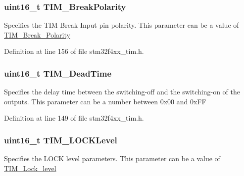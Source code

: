 \hypertarget{struct_t_i_m___b_d_t_r_init_type_def_a71f25c4b4d7207152436dd716a6cb2f1}{
\subsubsection[{T\-I\-M\-\_\-\-Break\-Polarity}]{\setlength{\rightskip}{0pt plus 5cm}uint16\-\_\-t T\-I\-M\-\_\-\-Break\-Polarity}}\label{struct_t_i_m___b_d_t_r_init_type_def_a71f25c4b4d7207152436dd716a6cb2f1}
Specifies the T\-I\-M Break Input pin polarity. This parameter can be a value of \hyperlink{group___t_i_m___break___polarity}{T\-I\-M\-\_\-\-Break\-\_\-\-Polarity} 

Definition at line 156 of file stm32f4xx\-\_\-tim.\-h.

\hypertarget{struct_t_i_m___b_d_t_r_init_type_def_a136119743510d706b94e605f86b31f82}{
\subsubsection[{T\-I\-M\-\_\-\-Dead\-Time}]{\setlength{\rightskip}{0pt plus 5cm}uint16\-\_\-t T\-I\-M\-\_\-\-Dead\-Time}}\label{struct_t_i_m___b_d_t_r_init_type_def_a136119743510d706b94e605f86b31f82}
Specifies the delay time between the switching-\/off and the switching-\/on of the outputs. This parameter can be a number between 0x00 and 0x\-F\-F 

Definition at line 149 of file stm32f4xx\-\_\-tim.\-h.

\hypertarget{struct_t_i_m___b_d_t_r_init_type_def_acba399df603976d328261af5cd9ae011}{
\subsubsection[{T\-I\-M\-\_\-\-L\-O\-C\-K\-Level}]{\setlength{\rightskip}{0pt plus 5cm}uint16\-\_\-t T\-I\-M\-\_\-\-L\-O\-C\-K\-Level}}\label{struct_t_i_m___b_d_t_r_init_type_def_acba399df603976d328261af5cd9ae011}
Specifies the L\-O\-C\-K level parameters. This parameter can be a value of \hyperlink{group___t_i_m___lock__level}{T\-I\-M\-\_\-\-Lock\-\_\-level} 

